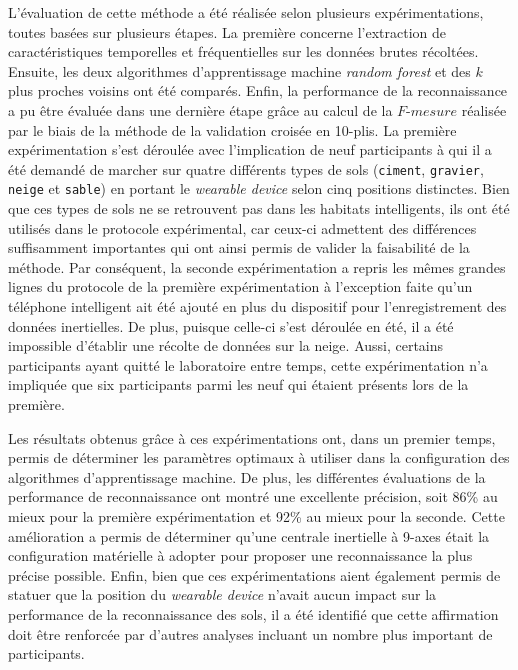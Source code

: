 L'évaluation de cette méthode a été réalisée selon plusieurs expérimentations, toutes basées sur plusieurs étapes. La première concerne l'extraction de caractéristiques temporelles et fréquentielles sur les données brutes récoltées. Ensuite, les deux algorithmes d'apprentissage machine \textit{random forest} et des $k$ plus proches voisins ont été comparés. Enfin, la performance de la reconnaissance a pu être évaluée dans une dernière étape grâce au calcul de la $F\mbox{-} mesure$ réalisée par le biais de la méthode de la validation croisée en 10-plis. La première expérimentation s'est déroulée avec l'implication de neuf participants à qui il a été demandé de marcher sur quatre différents types de sols (\texttt{ciment}, \texttt{gravier}, \texttt{neige} et \texttt{sable}) en portant le \textit{wearable device} selon cinq positions distinctes. Bien que ces types de sols ne se retrouvent pas dans les habitats intelligents, ils ont été utilisés dans le protocole expérimental, car ceux-ci admettent des différences suffisamment importantes qui ont ainsi permis de valider la faisabilité de la méthode. Par conséquent, la seconde expérimentation a repris les mêmes grandes lignes du protocole de la première expérimentation à l'exception faite qu'un téléphone intelligent ait été ajouté en plus du dispositif pour l'enregistrement des données inertielles. De plus, puisque celle-ci s'est déroulée en été, il a été impossible d'établir une récolte de données sur la neige. Aussi, certains participants ayant quitté le laboratoire entre temps, cette expérimentation n'a impliquée que six participants parmi les neuf qui étaient présents lors de la première.

Les résultats obtenus grâce à ces expérimentations ont, dans un premier temps, permis de déterminer les paramètres optimaux à utiliser dans la configuration des algorithmes d'apprentissage machine. De plus, les différentes évaluations de la performance de reconnaissance ont montré une excellente précision, soit 86\% au mieux pour la première expérimentation et 92\% au mieux pour la seconde. Cette amélioration a permis de déterminer qu'une centrale inertielle à 9-axes était la configuration matérielle à adopter pour proposer une reconnaissance la plus précise possible. Enfin, bien que ces expérimentations aient également permis de statuer que la position du \textit{wearable device} n'avait aucun impact sur la performance de la reconnaissance des sols, il a été identifié que cette affirmation doit être renforcée par d'autres analyses incluant un nombre plus important de participants.
